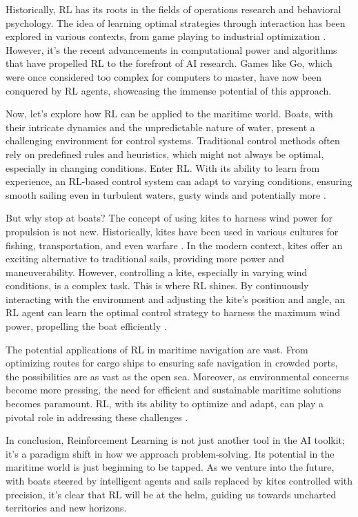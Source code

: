 Historically, RL has its roots in the fields of operations research and behavioral psychology. The idea of learning optimal strategies through interaction has been explored in various contexts, from game playing to industrial optimization \cite{bellman1957dynamic}. However, it's the recent advancements in computational power and algorithms that have propelled RL to the forefront of AI research. Games like Go, which were once considered too complex for computers to master, have now been conquered by RL agents, showcasing the immense potential of this approach\cite{silver2016mastering}.

Now, let's explore how RL can be applied to the maritime world. Boats, with their intricate dynamics and the unpredictable nature of water, present a challenging environment for control systems. Traditional control methods often rely on predefined rules and heuristics, which might not always be optimal, especially in changing conditions. Enter RL. With its ability to learn from experience, an RL-based control system can adapt to varying conditions, ensuring smooth sailing even in turbulent waters, gusty winds and potentially more \cite{yang2020reinforcement}.

But why stop at boats? The concept of using kites to harness wind power for propulsion is not new. Historically, kites have been used in various cultures for fishing, transportation, and even warfare \cite{hallion2003taking}. In the modern context, kites offer an exciting alternative to traditional sails, providing more power and maneuverability. However, controlling a kite, especially in varying wind conditions, is a complex task. This is where RL shines. By continuously interacting with the environment and adjusting the kite's position and angle, an RL agent can learn the optimal control strategy to harness the maximum wind power, propelling the boat efficiently \cite{erhard2013control}.

The potential applications of RL in maritime navigation are vast. From optimizing routes for cargo ships to ensuring safe navigation in crowded ports, the possibilities are as vast as the open sea. Moreover, as environmental concerns become more pressing, the need for efficient and sustainable maritime solutions becomes paramount. RL, with its ability to optimize and adapt, can play a pivotal role in addressing these challenges \cite{christiansen2013ship}.

In conclusion, Reinforcement Learning is not just another tool in the AI toolkit; it's a paradigm shift in how we approach problem-solving. Its potential in the maritime world is just beginning to be tapped. As we venture into the future, with boats steered by intelligent agents and sails replaced by kites controlled with precision, it's clear that RL will be at the helm, guiding us towards uncharted territories and new horizons\cite{mnih2015humanlevel}.

